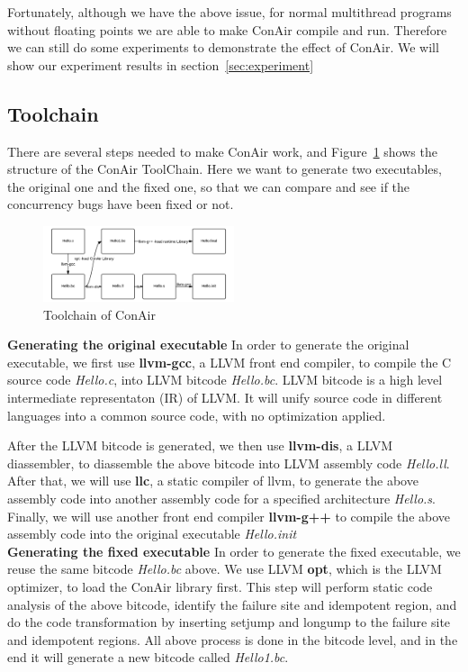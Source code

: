Fortunately, although we have the above issue, for normal multithread programs
without floating points we are able to make ConAir compile and run. Therefore we
can still do some experiments to demonstrate the effect of ConAir. We will show
our experiment results in section~\ref{sec:experiment}

\subsection{Toolchain}
There are several steps needed to make ConAir work, and
Figure~\ref{fig:toolchain} shows the structure of the ConAir ToolChain. Here we
want to generate two executables, the original one and the fixed one, so that we
can compare and see if the concurrency bugs have been fixed or not.\\
\begin{figure}[htbp]
\centering
\includegraphics[width=0.5\textwidth]{figs/toolchain.png}
\caption{Toolchain of ConAir}
\label{fig:toolchain}
\end{figure}
\textbf{Generating the original executable}
In order to generate the original executable, we first use \textbf{llvm-gcc}, a
LLVM front end compiler, to compile the C source code \textit{Hello.c}, into
LLVM bitcode \textit{Hello.bc}. LLVM bitcode is a high level intermediate
representaton (IR) of LLVM. It will unify source code in different languages
into a common source code, with no optimization applied.

After the LLVM bitcode is generated, we then use \textbf{llvm-dis}, a LLVM
diassembler, to diassemble the above bitcode into LLVM assembly code
\textit{Hello.ll}. After that, we will use \textbf{llc}, a static compiler of
llvm, to generate the above assembly code into another assembly code for a
specified architecture \textit{Hello.s}. Finally, we will use another front end
compiler \textbf{llvm-g++} to compile the above assembly code into the original
executable \textit{Hello.init}\\

\textbf{Generating the fixed executable}
In order to generate the fixed executable, we reuse the same bitcode
\textit{Hello.bc} above. We use LLVM \textbf{opt}, which is the LLVM optimizer,
to load the ConAir library first. This step will perform static code analysis of
the above bitcode, identify the failure site and idempotent region, and do the
code transformation by inserting setjump and longump to the failure site and
idempotent regions. All above process is done in the bitcode level, and in the
end it will generate a new bitcode called \textit{Hello1.bc}.

